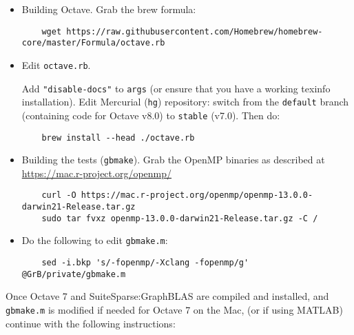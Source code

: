 \documentclass[12pt]{article}
\begin{document}
\begin{itemize}
\item Building Octave.  Grab the brew formula:

    {\scriptsize
    \begin{verbatim}
    wget https://raw.githubusercontent.com/Homebrew/homebrew-core/master/Formula/octave.rb
    \end{verbatim} }

\item Edit \verb'octave.rb'.

   Add \verb`"disable-docs"` to \verb`args` (or ensure that you have a working
   texinfo installation).
   Edit Mercurial (\verb`hg`) repository: switch from the \verb`default` branch
   (containing code for Octave v8.0) to \verb`stable` (v7.0).  Then do:

    {\small
    \begin{verbatim}
    brew install --head ./octave.rb
    \end{verbatim} }

\item Building the tests (\verb'gbmake').
    Grab the OpenMP binaries as described at
    \url{https://mac.r-project.org/openmp/}

    {\scriptsize
    \begin{verbatim}
    curl -O https://mac.r-project.org/openmp/openmp-13.0.0-darwin21-Release.tar.gz
    sudo tar fvxz openmp-13.0.0-darwin21-Release.tar.gz -C /
    \end{verbatim} }

\item Do the following to edit \verb'gbmake.m':

    {\scriptsize
    \begin{verbatim}
    sed -i.bkp 's/-fopenmp/-Xclang -fopenmp/g' @GrB/private/gbmake.m
    \end{verbatim} }

\end{itemize}

Once Octave 7 and SuiteSparse:GraphBLAS are compiled and installed,
and \verb'gbmake.m' is modified if needed for Octave 7 on the Mac,
(or if using MATLAB) continue with the following instructions:
\end{document}
